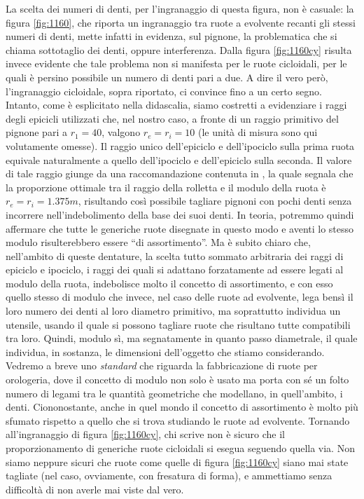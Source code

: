 \noindent La scelta dei numeri di denti, per l'ingranaggio di questa figura,
non \`e casuale: la figura
\ref{fig:1160}, che riporta un ingranaggio tra ruote a evolvente
recanti gli stessi numeri di denti, mette infatti in evidenza, sul pignone,
la problematica che si chiama sottotaglio dei denti, oppure
interferenza. Dalla figura \ref{fig:1160cy} risulta invece evidente che tale
problema non si manifesta per le ruote cicloidali, per le quali \`e
persino possibile un numero di denti pari a due.
A dire il vero per\`o, l'ingranaggio cicloidale, sopra riportato, ci convince
fino a un certo segno. Intanto, come \`e esplicitato nella didascalia,
siamo costretti a evidenziare i raggi degli epicicli utilizzati che, nel nostro
caso, a fronte di un raggio primitivo del pignone pari a $r_1=40$,
valgono $r_e=r_i=10$ (le unit\`a di misura sono qui volutamente omesse).
Il raggio unico dell'epiciclo e dell'ipociclo sulla
prima ruota equivale naturalmente a quello dell'ipociclo e dell'epiciclo
sulla seconda. Il valore di tale raggio giunge da una raccomandazione
contenuta in \cite{punzi}, la quale segnala che la proporzione ottimale tra
il raggio della rolletta e il modulo della ruota \`e $r_e=r_i=1.375 m$,
risultando cos\`i possibile
tagliare pignoni con pochi denti senza incorrere nell'indebolimento della
base dei suoi denti. In teoria, potremmo quindi affermare che tutte
 le generiche ruote disegnate in questo modo e
 aventi lo stesso modulo risulterebbero essere
``di assortimento''. Ma \`e subito chiaro che, nell'ambito di queste
dentature, la scelta
tutto sommato arbitraria dei raggi di epiciclo e ipociclo, i raggi
dei quali si adattano forzatamente ad essere legati al modulo della ruota,
indebolisce molto il concetto di assortimento, e con esso quello stesso
di modulo che invece, nel caso delle ruote ad evolvente, lega bens\`i il
loro numero dei denti al loro diametro primitivo, ma soprattutto individua
un utensile, usando il quale si possono tagliare
ruote che risultano tutte compatibili tra loro. Quindi, modulo s\`i, ma segnatamente
in quanto passo diametrale, il quale individua, in sostanza, le dimensioni
dell'oggetto che stiamo considerando. Vedremo a breve uno {\em standard}
che riguarda la fabbricazione di ruote per orologeria, dove il concetto
di modulo non solo \`e usato ma porta con s\'e un folto numero di
legami tra le quantit\`a geometriche che modellano, in quell'ambito,
i denti. Ciononostante, anche in quel mondo il concetto di assortimento
\`e molto pi\`u sfumato rispetto a quello che si trova studiando le ruote ad
evolvente. Tornando all'ingranaggio di figura \ref{fig:1160cy}, chi scrive 
non \`e sicuro che il  proporzionamento di generiche ruote cicloidali si esegua
seguendo quella via. Non siamo neppure sicuri che ruote come quelle
di figura \ref{fig:1160cy} siano mai state tagliate (nel caso, ovviamente,
con fresatura di forma), e ammettiamo senza difficolt\`a  di non
averle mai viste dal vero.


